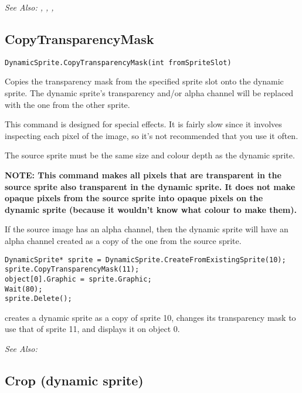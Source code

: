 \it{See Also:} ,
,
,


\subsection{CopyTransparencyMask}\label{DynamicSprite.CopyTransparencyMask}%

\begin{verbatim}
DynamicSprite.CopyTransparencyMask(int fromSpriteSlot)
\end{verbatim}
Copies the transparency mask from the specified sprite slot onto the dynamic sprite.
The dynamic sprite's transparency and/or alpha channel will be replaced with the
one from the other sprite.

This command is designed for special effects. It is fairly slow since it involves
inspecting each pixel of the image, so it's not recommended that you use it often.

The source sprite must be the same size and colour depth as the dynamic sprite.

\bf{NOTE:} This command makes all pixels that are transparent in the source sprite
also transparent in the dynamic sprite. It does not make opaque pixels from the
source sprite into opaque pixels on the dynamic sprite (because it wouldn't know
what colour to make them).

If the source image has an alpha channel, then the dynamic sprite will have an
alpha channel created as a copy of the one from the source sprite.

\begin{verbatim}
DynamicSprite* sprite = DynamicSprite.CreateFromExistingSprite(10);
sprite.CopyTransparencyMask(11);
object[0].Graphic = sprite.Graphic;
Wait(80);
sprite.Delete();
\end{verbatim}
creates a dynamic sprite as a copy of sprite 10, changes its transparency mask
to use that of sprite 11, and displays it on object 0.

\it{See Also:} 


\subsection{Crop (dynamic sprite)}\label{DynamicSprite.Crop}%

